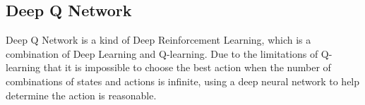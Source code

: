 \documentclass{article}
\begin{document}
    
    
    
    \subsection{Deep Q Network}
    Deep Q Network is a kind of Deep Reinforcement Learning, which is a combination of Deep Learning and Q-learning. Due to the limitations of Q-learning that it is impossible to choose the best action when the number of combinations of states and actions is infinite, using a deep neural network to help determine the action is reasonable.
    
\end{document}
